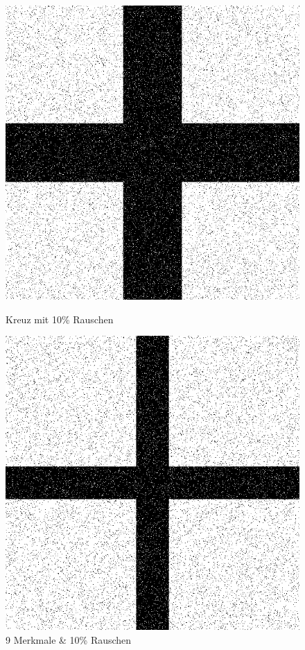 \begin{figure}[hbt]
	\begin{minipage}{0.49 \textwidth}
		\includegraphics[width=\textwidth]{./Bilder/Auswertung/BeispielBilder/Picture_Crossing_noise_10_pixelCnt_128_featureCnt_5}
		\caption{Kreuz mit 10\% Rauschen}
	\end{minipage}
	\hfill
	\begin{minipage}{0.49 \textwidth}
		\includegraphics[width=\textwidth]{./Bilder/Auswertung/BeispielBilder/Picture_Crossing_noise_10_pixelCnt_65_featureCnt_9}
		\caption{9 Merkmale \& 10\% Rauschen}
		\label{585px9M65pM10}
	\end{minipage}
\end{figure}

